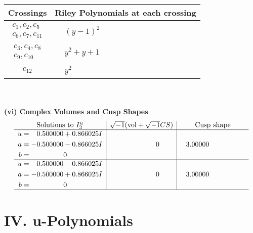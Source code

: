 \documentclass[1p]{elsarticle_modified}
\theoremstyle{definition}
\newcommand{\I}{\sqrt{-1}}
\begin{document}
\begin{tabular}{m{50pt}|m{274pt}}
Crossings & \hspace{64pt}Riley Polynomials at each crossing \\
\hline $$\begin{aligned}c_{1},c_{2},c_{5}\\c_{6},c_{7},c_{11}\end{aligned}$$&$\begin{aligned}
&(y-1)^2
\end{aligned}$\\
\hline $$\begin{aligned}c_{3},c_{4},c_{8}\\c_{9},c_{10}\end{aligned}$$&$\begin{aligned}
&y^2+y+1
\end{aligned}$\\
\hline $$\begin{aligned}c_{12}\end{aligned}$$&$\begin{aligned}
&y^2
\end{aligned}$\\
\hline
\end{tabular}\\~\\
\newpage\flushleft \textbf{(vi) Complex Volumes and Cusp Shapes}
$$\begin{array}{c|c|c}  
\text{Solutions to }I^u_{3}& \I (\text{vol} + \sqrt{-1}CS) & \text{Cusp shape}\\
 \hline 
\begin{aligned}
u &= \phantom{-}0.500000 + 0.866025 I \\
a &= -0.500000 - 0.866025 I \\
b &= \phantom{-0.000000 } 0\end{aligned}
 & \phantom{-0.000000 } 0 & \phantom{-}3.00000\phantom{ +0.000000I} \\ \hline\begin{aligned}
u &= \phantom{-}0.500000 - 0.866025 I \\
a &= -0.500000 + 0.866025 I \\
b &= \phantom{-0.000000 } 0\end{aligned}
 & \phantom{-0.000000 } 0 & \phantom{-}3.00000\phantom{ +0.000000I}\\
 \hline 
 \end{array}$$\newpage
\newpage\renewcommand{\arraystretch}{1}
\centering \section*{ IV. u-Polynomials}
\end{document}
